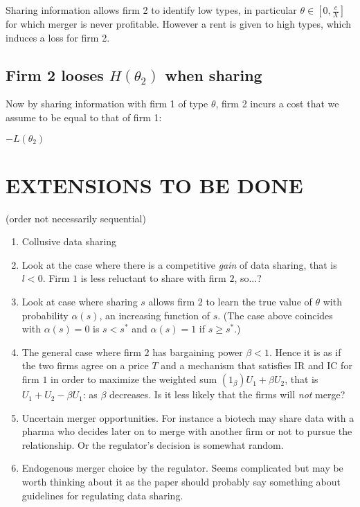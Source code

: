 \documentclass[a4paper]{article}
\renewcommand{\t}{\theta}
\begin{document}
Sharing information allows firm 2 to identify low types, in particular $\t\in[0,\frac{c}{X}]$ for which merger is never profitable. However a rent is given to high types, which induces a loss for firm 2.

\subsection{Firm 2 looses $H(\t_2)$ when sharing}

Now by sharing information with firm 1 of type $\t$, firm 2 incurs a cost that we assume to be equal to that of firm 1:

$-L(\t_2)$



\section{EXTENSIONS TO BE DONE}  
(order not necessarily sequential)
    \begin{enumerate}[TBD 1.]\setlength\itemsep{0em}
    \item Collusive data sharing
      \item Look at the case where there is a competitive \emph{gain} of data sharing, that is $l<0$. Firm $1$ is less reluctant to share with firm $2$, so...?
      \item Look at case where sharing $s$ allows firm $2$ to learn the true value of $\t$ with probability $\alpha(s)$, an increasing function of $s$. (The case above coincides with $\alpha(s)=0$ is $s<s^*$ and $\alpha(s)=1$ if $s\geq s^*$.)
      \item The general case where firm $2$ has bargaining power $\beta<1$. Hence it is as if the two firms agree on a price $T$ and a mechanism that satisfies IR and IC for firm $1$ in order to maximize the weighted sum $(1_\beta)U_1+\beta U_2$, that is $U_1+U_2-\beta U_1$: as $\beta$ decreases. Is it less likely that the firms will \emph{not} merge?
      \item Uncertain merger opportunities. For instance a biotech may share data with a pharma who decides later on to merge with another firm or not to pursue the relationship. Or the regulator's decision is somewhat random.
      \item Endogenous merger choice by the regulator. Seems complicated but may be worth thinking about it as the paper should probably say something about guidelines for regulating data sharing.
    \end{enumerate}



\end{document}
